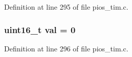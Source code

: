 \-Definition at line 295 of file pios\-\_\-tim.\-c.

\hypertarget{group___p_i_o_s___t_i_m_ga757344f09097232d715d55cbf9d61a43}{
\subsubsection[{val}]{\setlength{\rightskip}{0pt plus 5cm}uint16\-\_\-t {\bf val} = 0}}\label{group___p_i_o_s___t_i_m_ga757344f09097232d715d55cbf9d61a43}


\-Definition at line 296 of file pios\-\_\-tim.\-c.


